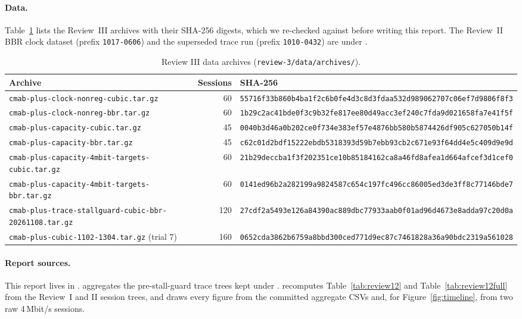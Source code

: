 \documentclass[sigconf]{acmart}
\begin{document}
\paragraph{Data.} Table~\ref{tab:archives} lists the Review~III archives with their SHA-256 digests, which we re-checked against  before writing this report. The Review~II BBR clock dataset (prefix \texttt{1017-0606}) and the superseded trace run (prefix \texttt{1010-0432}) are under .

\begin{table}[t]
\caption{Review III data archives (\texttt{review-3/data/archives/}).}
\label{tab:archives}
\footnotesize
\begin{tabular}{@{}lrl@{}}
\toprule
Archive & Sessions & SHA-256 \\
\midrule
\texttt{cmab-plus-clock-nonreg-cubic.tar.gz} & 60 & \texttt{55716f33b860b4ba1f2c6b0fe4d3c8d3fdaa532d989062707c06ef7d9806f8f3} \\
\texttt{cmab-plus-clock-nonreg-bbr.tar.gz} & 60 & \texttt{1b29c2ac41bde0f3c9b32fe817ee80d49acc3ef240c7fda9d021658fa7e41f5f} \\
\texttt{cmab-plus-capacity-cubic.tar.gz} & 45 & \texttt{0040b3d46a0b202ce0f734e383ef57e4876bb580b5874426df905c627050b14f} \\
\texttt{cmab-plus-capacity-bbr.tar.gz} & 45 & \texttt{c62c01d2bdf15222ebdb5318393d59b7ebb93cb2c671e93f64dd4e5c409d9e9d} \\
\texttt{cmab-plus-capacity-4mbit-targets-cubic.tar.gz} & 60 & \texttt{21b29deccba1f3f202351ce10b85184162ca8a46fd8afea1d664afcef3d1cef0} \\
\texttt{cmab-plus-capacity-4mbit-targets-bbr.tar.gz} & 60 & \texttt{0141ed96b2a282199a9824587c654c197fc496cc86005ed3de3ff8c77146bde7} \\
\texttt{cmab-plus-trace-stallguard-cubic-bbr-20261108.tar.gz} & 120 & \texttt{27cdf2a5493e126a84390ac889dbc77933aab0f01ad96d4673e8adda97c20d0a} \\
\texttt{cmab-plus-cubic-1102-1304.tar.gz} (trial 7) & 160 & \texttt{0652cda3862b6759a8bbd300ced771d9ec87c7461828a36a90bdc2319a561028} \\
\bottomrule
\end{tabular}
\end{table}

\paragraph{Report sources.} This report lives in .  aggregates the pre-stall-guard trace trees kept under .  recomputes Table~\ref{tab:review12} and Table~\ref{tab:review12full} from the Review~I and II session trees, and  draws every figure from the committed aggregate CSVs and, for Figure~\ref{fig:timeline}, from two raw 4\,Mbit/s sessions.
\end{document}
